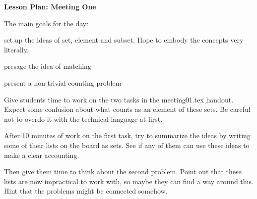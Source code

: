 \documentclass[12pt]{amsart}
\theoremstyle{definition}
\begin{document}
\begin{center}
\textbf{\Huge
Lesson Plan: Meeting One
}
\end{center}
\vspace{.5in}

The main goals for the day:
\begin{compactitem}
\item set up the ideas of set, element and subset. Hope to embody the concepts very literally.
\item presage the idea of matching
\item present a non-trivial counting problem
\end{compactitem}

Give students time to work on the two tasks in the meeting01.tex handout.
Expect some confusion about what counts as an element of these sets.
Be careful not to overdo it with the technical language at first.

After 10 minutes of work on the first task, try to summarize the ideas by writing some of their lists on the board as sets.
See if any of them can use these ideas to make a clear accounting.

Then give them time to think about the second problem.
Point out that these lists are now impractical to work with, so maybe they can find a way around this.
Hint that the problems might be connected somehow.
\end{document}
